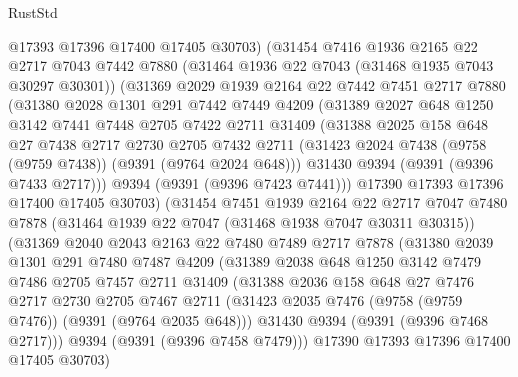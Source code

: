 \begin{lexlean}{RustStd}
\begin{coremodule}
      @17393
      @17396
      @17400
      @17405
      @30703)
    (@31454
      @7416
      @1936
      @2165
      @22
      @2717
      @7043
      @7442
      @7880
      (@31464 @1936 @22 @7043 (@31468 @1935 @7043 @30297 @30301))
      (@31369
        @2029
        @1939
        @2164
        @22
        @7442
        @7451
        @2717
        @7880
        (@31380
          @2028
          @1301
          @291
          @7442
          @7449
          @4209
          (@31389
            @2027
            @648
            @1250
            @3142
            @7441
            @7448
            @2705
            @7422
            @2711
            @31409
            (@31388
              @2025
              @158
              @648
              @27
              @7438
              @2717
              @2730
              @2705
              @7432
              @2711
              (@31423 @2024 @7438 (@9758 (@9759 @7438)) (@9391 (@9764 @2024 @648)))
              @31430
              @9394
              (@9391 (@9396 @7433 @2717)))
            @9394
            (@9391 (@9396 @7423 @7441)))
          @17390
          @17393
          @17396
          @17400
          @17405
          @30703)
        (@31454
          @7451
          @1939
          @2164
          @22
          @2717
          @7047
          @7480
          @7878
          (@31464 @1939 @22 @7047 (@31468 @1938 @7047 @30311 @30315))
          (@31369
            @2040
            @2043
            @2163
            @22
            @7480
            @7489
            @2717
            @7878
            (@31380
              @2039
              @1301
              @291
              @7480
              @7487
              @4209
              (@31389
                @2038
                @648
                @1250
                @3142
                @7479
                @7486
                @2705
                @7457
                @2711
                @31409
                (@31388
                  @2036
                  @158
                  @648
                  @27
                  @7476
                  @2717
                  @2730
                  @2705
                  @7467
                  @2711
                  (@31423 @2035 @7476 (@9758 (@9759 @7476)) (@9391 (@9764 @2035 @648)))
                  @31430
                  @9394
                  (@9391 (@9396 @7468 @2717)))
                @9394
                (@9391 (@9396 @7458 @7479)))
              @17390
              @17393
              @17396
              @17400
              @17405
              @30703)

\end{coremodule}
\end{lexlean}
